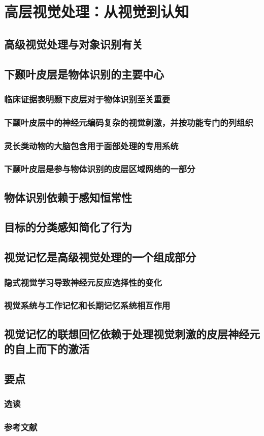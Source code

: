 \chapter{高层视觉处理：从视觉到认知}

\section{高级视觉处理与对象识别有关}

\section{下颞叶皮层是物体识别的主要中心}
\subsection{临床证据表明颞下皮层对于物体识别至关重要}
\subsection{下颞叶皮层中的神经元编码复杂的视觉刺激，并按功能专门的列组织}
\subsection{灵长类动物的大脑包含用于面部处理的专用系统}
\subsection{下颞叶皮层是参与物体识别的皮层区域网络的一部分}

\section{物体识别依赖于感知恒常性}

\section{目标的分类感知简化了行为}

\section{视觉记忆是高级视觉处理的一个组成部分}
\subsection{隐式视觉学习导致神经元反应选择性的变化}
\subsection{视觉系统与工作记忆和长期记忆系统相互作用}

\section{视觉记忆的联想回忆依赖于处理视觉刺激的皮层神经元的自上而下的激活}

\section{要点}
\subsection{选读}
\subsection{参考文献}